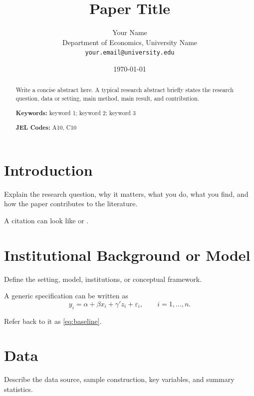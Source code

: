 \documentclass[11pt]{article}
\title{Paper Title}
\author{
    Your Name\\
    Department of Economics, University Name\\
    \texttt{your.email@university.edu}
}
\date{\today}
\begin{document}
\maketitle

\begin{abstract}
Write a concise abstract here. A typical research abstract briefly states the research question, data or setting, main method, main result, and contribution.

\vspace{0.5em}
\noindent\textbf{Keywords:} keyword 1; keyword 2; keyword 3

\noindent\textbf{JEL Codes:} A10, C10
\end{abstract}

\section{Introduction}\label{sec:introduction}
Explain the research question, why it matters, what you do, what you find, and how the paper contributes to the literature.

A citation can look like \citet{example2020} or \citep{example2020}.

\section{Institutional Background or Model}\label{sec:background}
Define the setting, model, institutions, or conceptual framework.

A generic specification can be written as
\begin{equation}\label{eq:baseline}
    y_i = \alpha + \beta x_i + \gamma' z_i + \varepsilon_i,
    \qquad i=1,\ldots,n.
\end{equation}

Refer back to it as \cref{eq:baseline}.

\section{Data}\label{sec:data}
Describe the data source, sample construction, key variables, and summary statistics.
\end{document}
